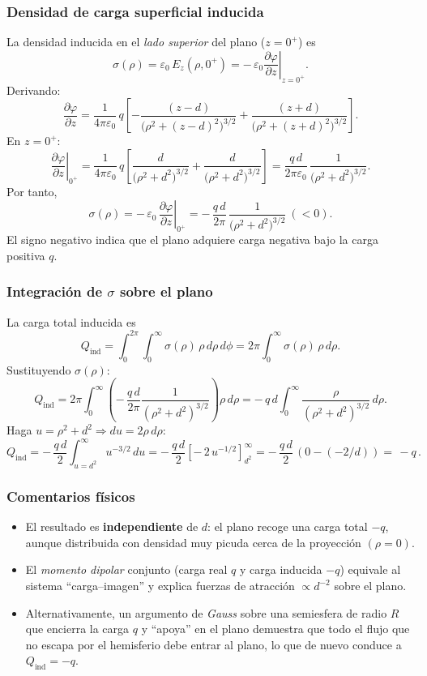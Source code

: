 \documentclass{article}
\begin{document}
\subsubsection*{Densidad de carga superficial inducida}
La densidad inducida en el \emph{lado superior} del plano ($z=0^+$) es
\[
\sigma(\rho)=\varepsilon_0\,E_{z}(\rho,0^+)
= -\,\varepsilon_0\left.\frac{\partial\varphi}{\partial z}\right|_{z=0^+}.
\]
Derivando:
\[
\frac{\partial\varphi}{\partial z}
=\frac{1}{4\pi\varepsilon_0}\,q\left[
-\frac{(z-d)}{\big(\rho^2+(z-d)^2\big)^{3/2}}
+\frac{(z+d)}{\big(\rho^2+(z+d)^2\big)^{3/2}}
\right].
\]
En $z=0^+$:
\[
\left.\frac{\partial\varphi}{\partial z}\right|_{0^+}
=\frac{1}{4\pi\varepsilon_0}\,q\left[
\frac{d}{\big(\rho^2+d^2\big)^{3/2}}
+\frac{d}{\big(\rho^2+d^2\big)^{3/2}}
\right]
=\frac{q\,d}{2\pi\varepsilon_0}\,\frac{1}{\big(\rho^2+d^2\big)^{3/2}}.
\]
Por tanto,
\[
\boxed{\;
\sigma(\rho)=-\,\varepsilon_0\,\left.\frac{\partial\varphi}{\partial z}\right|_{0^+}
=-\,\frac{q\,d}{2\pi}\,\frac{1}{\big(\rho^2+d^2\big)^{3/2}}\ (<0).\;}
\]
El signo negativo indica que el plano adquiere carga negativa bajo la carga positiva $q$.

\subsubsection*{Integración de $\sigma$ sobre el plano}
La carga total inducida es
\[
Q_{\text{ind}}=\int_{0}^{2\pi}\!\!\int_{0}^{\infty}\sigma(\rho)\,\rho\,d\rho\,d\phi
=2\pi\int_{0}^{\infty}\sigma(\rho)\,\rho\,d\rho.
\]
Sustituyendo $\sigma(\rho)$:
\[
Q_{\text{ind}}=2\pi\int_{0}^{\infty}\left(-\,\frac{q\,d}{2\pi}\frac{1}{(\rho^2+d^2)^{3/2}}\right)\rho\,d\rho
=-\,q\,d\int_{0}^{\infty}\frac{\rho}{(\rho^2+d^2)^{3/2}}\,d\rho.
\]
Haga $u=\rho^2+d^2\Rightarrow du=2\rho\,d\rho$:
\[
Q_{\text{ind}}=-\,\frac{q\,d}{2}\int_{u=d^2}^{\infty}u^{-3/2}\,du
=-\,\frac{q\,d}{2}\left[ -\,2\,u^{-1/2}\right]_{d^2}^{\infty}
=-\,\frac{q\,d}{2}\,(0-(-2/d))=\boxed{\,-q\,}.
\]

\subsubsection*{Comentarios físicos}
\begin{itemize}
\item El resultado es \textbf{independiente} de $d$: el plano recoge una carga total $-q$, aunque distribuida con densidad muy picuda cerca de la proyección $(\rho=0)$.
\item El \emph{momento dipolar} conjunto (carga real $q$ y carga inducida $-q$) equivale al sistema “carga–imagen” y explica fuerzas de atracción $\propto d^{-2}$ sobre el plano.
\item Alternativamente, un argumento de \emph{Gauss} sobre una semiesfera de radio $R$ que encierra la carga $q$ y “apoya” en el plano demuestra que todo el flujo que no escapa por el hemisferio debe entrar al plano, lo que de nuevo conduce a $Q_{\text{ind}}=-q$.
\end{itemize}
\end{document}
